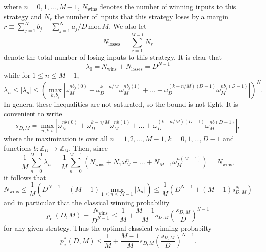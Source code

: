 \documentclass[prb,twocolumn,showpacs,amssymb,superscriptaddress]{revtex4-2}
\begin{document}
where $n=0,1,\ldots,M-1$, $N_{\mathrm{wins}}$ denotes the number of winning inputs to this strategy and $N_{r}$ the number of inputs that this strategy loses by a margin $r \equiv \sum_{j=1}^N b_j -\sum_{j=1}^N a_j/D \,\mathrm{mod}\, M$. We also let
\begin{equation}
N_{\mathrm{losses}} = \sum_{r=1}^{M-1} N_r
\end{equation}
denote the total number of losing inputs to this strategy. It is clear that
\begin{equation}
\lambda_0 = N_{\mathrm{wins}} + N_{\mathrm{losses}} = D^{N-1}
\end{equation}
while for $1 \leq n \leq M-1$,
\begin{equation}
\lambda_n \leq |\lambda_n| \leq \left(\max_{k,b_j} \left|\omega_M^{nb_j(0)} + \omega_D^{k-n/M}\omega_M^{nb_j(1)} + \ldots + \omega_D^{(k-n/M)(D-1)}\omega_M^{nb_j(D-1)}\right|\right)^N.
\end{equation}
In general these inequalities are not saturated, so the bound is not tight. It is convenient to write
\begin{equation}
\label{eq:ub}
s_{D,M} = \max_{n,k,b} \left|\omega_M^{nb(0)} + \omega_D^{k-n/M}\omega_M^{nb(1)} + \ldots + \omega_D^{(k-n/M)(D-1)}\omega_M^{nb(D-1)}\right|,
\end{equation}
where the maximization is over all $n=1,2,\ldots,M-1$, $k=0,1,\ldots,D-1$ and functions $b : \mathbb{Z}_D \to \mathbb{Z}_M$. Then, since
\begin{equation}
\frac{1}{M}\sum_{n=0}^{M-1} \lambda_n = \frac{1}{M}\sum_{n=0}^{M-1} \left(N_{\mathrm{wins}} + N_{1} \omega^n_M + \ldots + N_{M-1} \omega_M^{n(M-1)}\right) = N_{\mathrm{wins}},
\end{equation}
it follows that
\begin{equation}
N_{\mathrm{wins}} \leq \frac{1}{M}\left(D^{N-1} + (M-1)\max_{1\leq n \leq M-1} |\lambda_n|\right) \leq \frac{1}{M}\left(D^{N-1} + (M-1)s_{D,M}^N\right)
\end{equation}
and in particular that the classical winning probability
\begin{equation}
p_{\mathrm{cl}}(D,M) = \frac{N_{\mathrm{wins}}}{D^{N-1}} \leq \frac{1}{M} + \frac{M-1}{M} s_{D,M} \left(\frac{s_{D,M}}{D}\right)^{N-1}
\end{equation}
for any given strategy. Thus the optimal classical winning probabilty
\begin{equation}
p^*_{\mathrm{cl}}(D,M) \leq \frac{1}{M} + \frac{M-1}{M} s_{D,M} \left(\frac{s_{D,M}}{D}\right)^{N-1}.
\end{equation}
\end{document}
